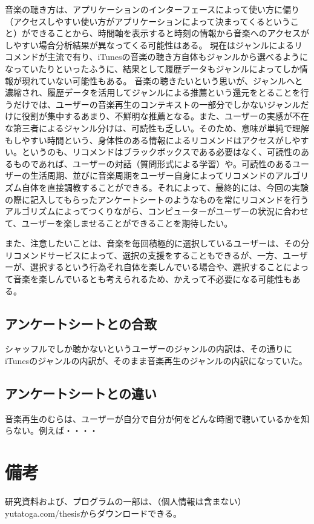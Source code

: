 \documentclass{jsarticle}
\begin{document}
音楽の聴き方は、アプリケーションのインターフェースによって使い方に偏り（アクセスしやすい使い方がアプリケーションによって決まってくるということ）ができることから、時間軸を表示すると時刻の情報から音楽へのアクセスがしやすい場合分析結果が異なってくる可能性はある。
現在はジャンルによるリコメンドが主流で有り、iTunesの音楽の聴き方自体もジャンルから選べるようになっていたりといったふうに、結果として履歴データもジャンルによってしか情報が現れていない可能性もある。
音楽の聴きたいという思いが、ジャンルへと濃縮され、履歴データを活用してジャンルによる推薦という還元をとることを行うだけでは、ユーザーの音楽再生のコンテキストの一部分でしかないジャンルだけに役割が集中するあまり、不鮮明な推薦となる。また、ユーザーの実感が不在な第三者によるジャンル分けは、可読性も乏しい。そのため、意味が単純で理解もしやすい時間という、身体性のある情報によるリコメンドはアクセスがしやすい。というのも、リコメンドはブラックボックスである必要はなく、可読性のあるものであれば、ユーザーの対話（質問形式による学習）や。可読性のあるユーザーの生活周期、並びに音楽周期をユーザー自身によってリコメンドのアルゴリズム自体を直接調教することができる。それによって、最終的には、今回の実験の際に記入してもらったアンケートシートのようなものを常にリコメンドを行うアルゴリズムによってつくりながら、コンピューターがユーザーの状況に合わせて、ユーザーを楽しませることができることを期待したい。

また、注意したいことは、音楽を毎回積極的に選択しているユーザーは、その分リコメンドサービスによって、選択の支援をすることもできるが、一方、ユーザーが、選択するという行為それ自体を楽しんでいる場合や、選択することによって音楽を楽しんでいるとも考えられるため、かえって不必要になる可能性もある。
\subsection{アンケートシートとの合致}
シャッフルでしか聴かないというユーザーのジャンルの内訳は、その通りにiTunesのジャンルの内訳が、そのまま音楽再生のジャンルの内訳になっていた。

\subsection{アンケートシートとの違い}
音楽再生のむらは、ユーザーが自分で自分が何をどんな時間で聴いているかを知らない。例えば・・・・

\section{備考}
研究資料および、プログラムの一部は、（個人情報は含まない）
yutatoga.com/thesisからダウンロードできる。
\end{document}
